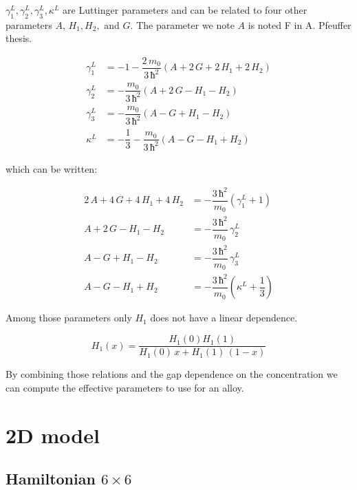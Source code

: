 \documentclass[prb,aps]{revtex4}
\begin{document}
        $γ_1^L, γ_2^L, γ_3^L, κ^L$ are Luttinger parameters and can be related to four other parameters $A$, $H_1, H_2,$ and $G$. The parameter we note $A$ is noted F in A. Pfeuffer thesis.
        
        \begin{align}
            γ_1^L &= - 1 - \dfrac{2\,m_0}{3\,ħ^2}\left(A + 2\,G + 2\,H_1 + 2\,H_2 \right)\\
            γ_2^L &= - \dfrac{m_0}{3\,ħ^2}\left( A + 2\,G - H_1 - H_2 \right)\\
            γ_3^L &= - \dfrac{m_0}{3\,ħ^2}\left( A - G + H_1 - H_2 \right)\\
            κ^L &= - \dfrac{1}{3} - \dfrac{m_0}{3\,ħ^2}\left( A - G - H_1 + H_2 \right)
        \end{align}
        
        which can be written:
        
        \begin{align}
            2\,A + 4\,G + 4\,H_1 + 4\,H_2 &= -\dfrac{3\,ħ^2}{m_0} \left( γ_1^L + 1 \right)\\
            A + 2\,G - H_1 - H_2 &= - \dfrac{3\,ħ^2}{m_0}\,γ_2^L\\
            A - G + H_1 - H_2 &= - \dfrac{3\,ħ^2}{m_0}\,γ_3^L\\
            A - G - H_1 + H_2 &= - \dfrac{3\,ħ^2}{m_0}\left( κ^L + \dfrac{1}{3} \right)
        \end{align}
        
        Among those parameters only $H_1$ does not have a linear dependence.
        
        \begin{equation}
            H_1(x) = \dfrac{H_1(0)H_1(1)}{H_1(0)\,x + H_1(1)\,(1-x)}
        \end{equation}
     
        By combining those relations and the gap dependence on the concentration we can compute the effective parameters to use for an alloy.

\section{2D model}

	\subsection{Hamiltonian $6\times6$}

\newcommand{\CA}[1]{\{{#1}\}_A}
\newcommand{\CS}[1]{\{{#1}\}_S}
\end{document}
